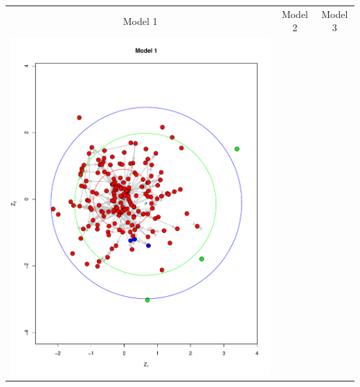 \documentclass[fleqn,12pt]{wlscirep}
\begin{document}
\begin{longtable}[!h]{ccc}
Model 1 & Model 2 & Model 3\\
\includegraphics[height=.3\textheight, clip=true, trim=2.06cm 2.55cm 1cm 2cm]{figures/LSM_m1.pdf}   & 

\end{longtable}
\end{document}
